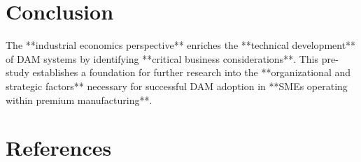 \documentclass[a4paper,12pt,twocolumn]{article}
\begin{document}
\section{Conclusion}
The **industrial economics perspective** enriches the **technical development** of DAM systems by identifying **critical business considerations**.  
This pre-study establishes a foundation for further research into the **organizational and strategic factors** necessary for successful DAM adoption in **SMEs operating within premium manufacturing**.

\section{References}

\end{document}
